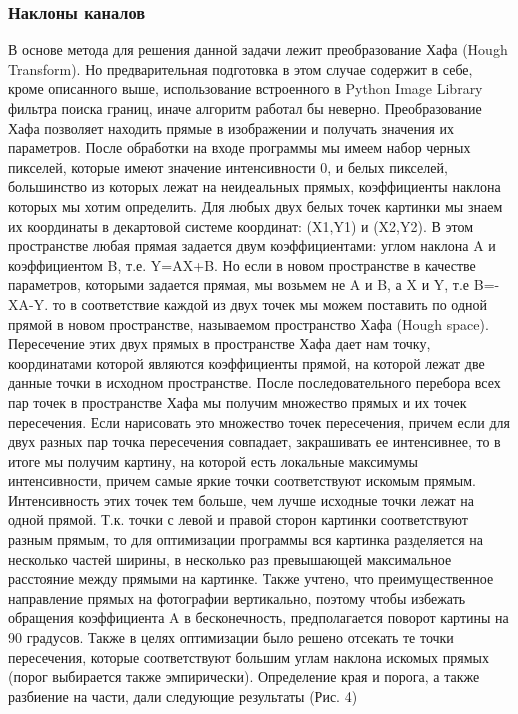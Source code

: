 \documentclass[twocolumn,10pt,russian]{/usr/lib/python3.3/site-packages/sphinx/texinputs/sphinxhowto}
\begin{document}
\subsubsection{Наклоны каналов}
В основе метода для решения данной задачи лежит преобразование Хафа
(Hough Transform). Но предварительная подготовка в этом случае содержит
в себе, кроме описанного выше, использование встроенного в Python Image
Library фильтра поиска границ, иначе алгоритм работал бы неверно. Преобразование Хафа позволяет находить прямые в изображении и получать
значения их параметров. После обработки на входе программы мы имеем
набор черных пикселей, которые имеют значение интенсивности 0, и белых
пикселей, большинство из которых лежат на неидеальных прямых,
коэффициенты наклона которых мы хотим определить. Для любых двух белых
точек картинки мы знаем их координаты в декартовой системе координат:
(X1,Y1) и (X2,Y2). В этом пространстве любая прямая задается двум
коэффициентами: углом наклона A и коэффициентом B, т.е. Y=AX+B. Но если
в новом пространстве в качестве параметров, которыми задается прямая, мы
возьмем не A и B, а X и Y, т.е B=-XA-Y. то в соответствие каждой из двух
точек мы можем поставить по одной прямой в новом пространстве,
называемом пространство Хафа (Hough space). Пересечение этих двух прямых
в пространстве Хафа дает нам точку, координатами которой являются
коэффициенты прямой, на которой лежат две данные точки в исходном
пространстве. После последовательного перебора всех пар точек в
пространстве Хафа мы получим множество прямых и их точек пересечения.
Если нарисовать это множество точек пересечения, причем если для двух
разных пар точка пересечения совпадает, закрашивать ее интенсивнее, то в
итоге мы получим картину, на которой есть локальные максимумы
интенсивности, причем самые яркие точки соответствуют искомым прямым.
Интенсивность этих точек тем больше, чем лучше исходные точки лежат на
одной прямой. Т.к. точки с левой и правой сторон картинки соответствуют
разным прямым, то для оптимизации программы вся картинка разделяется на
несколько частей ширины, в несколько раз превышающей максимальное
расстояние между прямыми на картинке. Также учтено, что преимущественное
направление прямых на фотографии вертикально, поэтому чтобы избежать
обращения коэффициента A в бесконечность, предполагается поворот картины
на 90 градусов. Также в целях оптимизации было решено отсекать те точки
пересечения, которые соответствуют большим углам наклона искомых прямых
(порог выбирается также эмпирически).
Определение края и порога, а также разбиение на части, дали следующие
результаты (Рис. 4)
\end{document}
